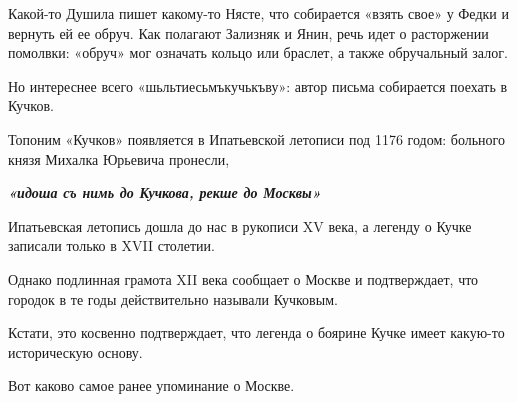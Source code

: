 Какой-то Душила пишет какому-то Нясте, что собирается «взять свое» у Федки и
вернуть ей ее обруч. Как полагают Зализняк и Янин, речь идет о расторжении
помолвки: «обруч» мог означать кольцо или браслет, а также обручальный залог.

Но интереснее всего «шьльтиесьмъкучькъву»: автор письма собирается поехать в
Кучков.

Топоним «Кучков» появляется в Ипатьевской летописи под 1176 годом: больного
князя Михалка Юрьевича пронесли,

\begin{leftbar}
  \begingroup
    \em\Large\bfseries\color{blue}
«идоша съ нимь до Кучкова, рекше до Москвы»
  \endgroup
\end{leftbar}

Ипатьевская летопись дошла до нас в рукописи XV века, а легенду о Кучке
записали только в XVII столетии.

Однако подлинная грамота XII века сообщает о Москве и подтверждает, что городок
в те годы действительно называли Кучковым.

Кстати, это косвенно подтверждает, что легенда о боярине Кучке имеет какую-то
историческую основу.

Вот каково самое ранее упоминание о Москве.
